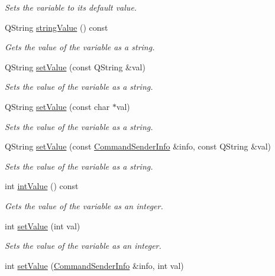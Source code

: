 \begin{DoxyCompactItemize}
\begin{DoxyCompactList}\small\item\em Sets the variable to its default value. \end{DoxyCompactList}\item 
Q\-String \hyperlink{class_con_var_a4c695572863c6f17ea0b7afe72373404}{string\-Value} () const 
\begin{DoxyCompactList}\small\item\em Gets the value of the variable as a string. \end{DoxyCompactList}\item 
Q\-String \hyperlink{class_con_var_a855c6e0548e43aaa8876e90581a5e5f3}{set\-Value} (const Q\-String \&val)
\begin{DoxyCompactList}\small\item\em Sets the value of the variable as a string. \end{DoxyCompactList}\item 
Q\-String \hyperlink{class_con_var_abd2daa3a4639d78df9b8a1d5aab3eb48}{set\-Value} (const char $\ast$val)
\begin{DoxyCompactList}\small\item\em Sets the value of the variable as a string. \end{DoxyCompactList}\item 
Q\-String \hyperlink{class_con_var_abc13cb366963b4589ae110fcee845374}{set\-Value} (const \hyperlink{class_command_sender_info}{Command\-Sender\-Info} \&info, const Q\-String \&val)
\begin{DoxyCompactList}\small\item\em Sets the value of the variable as a string. \end{DoxyCompactList}\item 
int \hyperlink{class_con_var_a81d5b979e23aba488e908089a86cb909}{int\-Value} () const 
\begin{DoxyCompactList}\small\item\em Gets the value of the variable as an integer. \end{DoxyCompactList}\item 
int \hyperlink{class_con_var_ac397b3e4935d515533ad2331a9548db5}{set\-Value} (int val)
\begin{DoxyCompactList}\small\item\em Sets the value of the variable as an integer. \end{DoxyCompactList}\item 
int \hyperlink{class_con_var_a2e66bffaa4d5e254f5b2bb17384bd346}{set\-Value} (\hyperlink{class_command_sender_info}{Command\-Sender\-Info} \&info, int val)

\end{DoxyCompactItemize}
